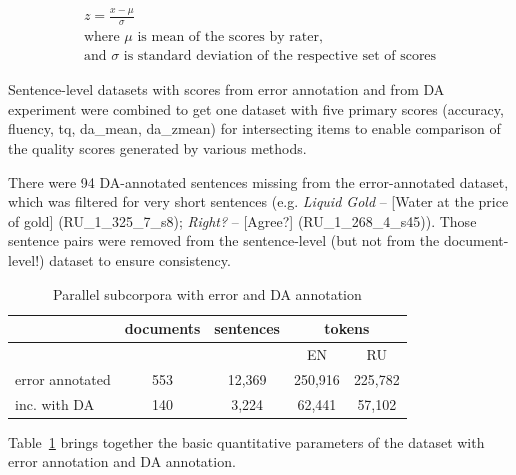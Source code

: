 
\begin{equation}\label{eq:zscore}
\begin{split}
z = \frac{x - \mu}{\sigma} \\
\text{where $\mu$ is mean of the scores by rater,} \\
\text{and $\sigma$ is standard deviation of the respective set of scores}
\end{split}
\end{equation}

Sentence-level datasets with scores from error annotation and from DA experiment were combined to get one dataset with five primary scores (accuracy, fluency, tq, da\_mean, da\_zmean) for intersecting items to enable comparison of the quality scores generated by various methods. 

There were 94 DA-annotated sentences missing from the error-annotated dataset, which was filtered for very short sentences (e.g. \textit{Liquid Gold} --  [Water at the price of gold] (RU\_1\_325\_7\_s8); \textit{Right?} --  [Agree?] (RU\_1\_268\_4\_s45)).
Those sentence pairs were removed from the sentence-level (but not from the document-level!) dataset to ensure consistency.
\begin{table}[H]
	\centering
	\begin{tabular}{l|c|c|cc}
		\toprule
		
		& documents & sentences & \multicolumn{2}{c}{tokens} \\
		\midrule
		&      &        & EN      &  RU \\
		error annotated & 553  & 12,369 & 250,916 & 225,782 \\
		\hspace{1em} inc. with DA & 140  & 3,224 & 62,441 & 57,102 \\
		\bottomrule
	\end{tabular}
	\caption{\label{tab:sent_err_da} Parallel subcorpora with error and DA annotation}
\end{table}

Table~\ref{tab:sent_err_da} brings together the basic quantitative parameters of the dataset with error annotation and DA annotation.

